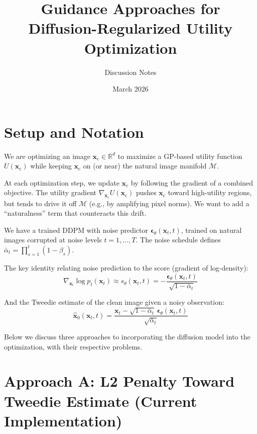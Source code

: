 \documentclass[11pt]{article}
\title{Guidance Approaches for Diffusion-Regularized Utility Optimization}
\author{Discussion Notes}
\date{March 2026}
\newcommand{\xb}{\mathbf{x}}
\newcommand{\xc}{\xb_{\mathrm{c}}}  %
\newcommand{\eb}{\boldsymbol{\epsilon}}
\newcommand{\R}{\mathbb{R}}
\newcommand{\alphabar}{\bar{\alpha}}
\begin{document}
\maketitle

\section{Setup and Notation}

We are optimizing an image $\xc \in \R^d$ to maximize a GP-based utility function $U(\xc)$
while keeping $\xc$ on (or near) the natural image manifold $\mathcal{M}$.

At each optimization step, we update $\xc$ by following the gradient of a combined objective.
The utility gradient $\nabla_{\xc} U(\xc)$ pushes $\xc$ toward high-utility regions, but tends to
drive it off $\mathcal{M}$ (e.g., by amplifying pixel norms). We want to add a ``naturalness'' term
that counteracts this drift.

We have a trained DDPM with noise predictor $\eb_\theta(\xb_t, t)$, trained on natural images
corrupted at noise levels $t = 1, \ldots, T$. The noise schedule defines $\alphabar_t = \prod_{s=1}^t (1-\beta_s)$.

The key identity relating noise prediction to the score (gradient of log-density):
\begin{equation}
    \nabla_{\xb_t} \log p_t(\xb_t) \approx s_\theta(\xb_t, t)
    = -\frac{\eb_\theta(\xb_t, t)}{\sqrt{1 - \alphabar_t}}
    \label{eq:score_from_eps}
\end{equation}

And the Tweedie estimate of the clean image given a noisy observation:
\begin{equation}
    \hat{\xb}_0(\xb_t, t)
    = \frac{\xb_t - \sqrt{1 - \alphabar_t}\, \eb_\theta(\xb_t, t)}{\sqrt{\alphabar_t}}
    \label{eq:tweedie}
\end{equation}

Below we discuss three approaches to incorporating the diffusion model into the optimization,
with their respective problems.


\section{Approach A: L2 Penalty Toward Tweedie Estimate (Current Implementation)}
\end{document}
